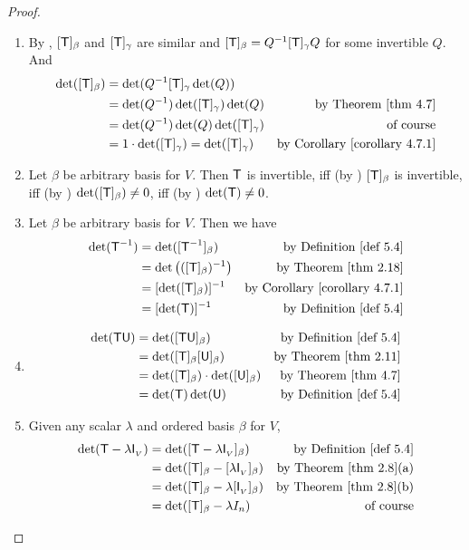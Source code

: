 \begin{proof} \ 

\begin{enumerate}
\item By , \([\textsf{T}]_{\beta}\) and \([\textsf{T}]_{\gamma}\) are similar and \([\textsf{T}]_{\beta} = Q^{-1} [\textsf{T}]_{\gamma} Q\) for some invertible \(Q\).
And
\begin{align*}
    \det([\T]_{\beta}) & = \det(Q^{-1} [\T]_{\gamma} \det(Q)) \\
        & = \det(Q^{-1}) \det([\T]_{\gamma}) \det(Q) & \text{by \THM{4.7}} \\
        & = \det(Q^{-1}) \det(Q) \det([\T]_{\gamma}) & \text{of course} \\
        & = 1 \cdot \det([\T]_{\gamma}) =  \det([\T]_{\gamma}) & \text{by \CORO{4.7.1}}
\end{align*}

\item Let \(\beta\) be arbitrary basis for \(V\).
Then \(\textsf{T}\) is invertible, iff (by ) \([\textsf{T}]_{\beta}\) is invertible, iff (by ) \(\det([\textsf{T}]_{\beta}) \ne 0\), iff (by ) \(\det(\textsf{T}) \ne 0\).

\item Let \(\beta\) be arbitrary basis for \(V\).
Then we have
\begin{align*}
    \det(\T^{-1}) & = \det([\T^{-1}]_{\beta}) & \text{by \DEF{5.4}} \\
                  & = \det\left( ([\T]_{\beta})^{-1} \right) & \text{by \THM{2.18}} \\
                  & = [\det([\T]_{\beta})]^{-1} & \text{by \CORO{4.7.1}} \\
                  & = [\det(\T)]^{-1} & \text{by \DEF{5.4}}
\end{align*}

\item
\begin{align*}
    \det(\T\U) & = \det([\T\U]_{\beta}) & \text{by \DEF{5.4}} \\
               & = \det([\T]_{\beta} [\U]_{\beta}) & \text{by \THM{2.11}} \\
               & = \det([\T]_{\beta}) \cdot \det([\U]_{\beta}) & \text{by \THM{4.7}} \\
               & = \det(\T) \det(\U) & \text{by \DEF{5.4}}
\end{align*}

\item
Given any scalar \(\lambda\) and ordered basis \(\beta\) for \(V\),
\begin{align*}
    \det(\T - \lambda \ITRANV) & = \det([\T - \lambda \ITRANV]_{\beta}) & \text{by \DEF{5.4}} \\
        & = \det([\T]_{\beta} - [\lambda \ITRANV]_{\beta}) & \text{by \THM{2.8}(a)} \\
        & = \det([\T]_{\beta} - \lambda[\ITRANV]_{\beta}) & \text{by \THM{2.8}(b)} \\
        & = \det([\T]_{\beta} - \lambda I_n) & \text{of course}
\end{align*}
\end{enumerate}
\end{proof}

